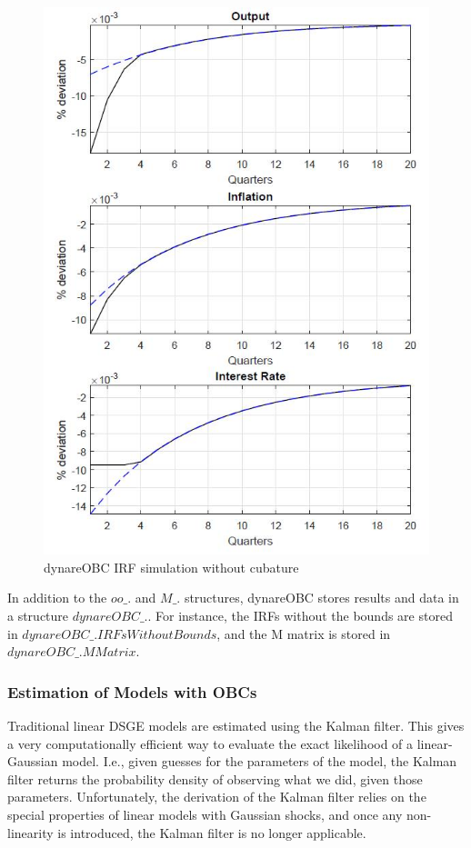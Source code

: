 \documentclass[10pt,math=newtx,citestyle=gb7714-2015,bibstyle=gb7714-2015]{elegantbook}
\begin{document}
{\begin{figure}[htbp!]
	\centering
	\includegraphics[width=0.8\linewidth]{FIG/dynareOBC}
	\caption{dynareOBC IRF simulation without cubature}\label{4.4}
	\centering
\end{figure}

In addition to the $oo\_.$ and $M\_.$ structures, dynareOBC stores results and data in a structure $dynareOBC\_.$. For instance, the IRFs without the bounds are stored in $dynareOBC\_.IRFsWithoutBounds$, and the M matrix is stored in $dynareOBC\_.MMatrix$.

\subsubsection{Estimation of Models with OBCs}

Traditional linear DSGE models are estimated using the Kalman filter. This gives a very computationally efficient way to evaluate the exact likelihood of a linear-Gaussian model. I.e., given guesses for the parameters of the model, the Kalman filter returns the probability density of observing what we did, given those parameters. Unfortunately, the derivation of the Kalman filter relies on the special properties of linear models with Gaussian shocks, and once any non-linearity is introduced, the Kalman filter is no longer applicable.

}
\end{document}
